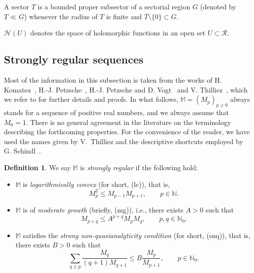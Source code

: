 \documentclass[11pt,a4paper]{article}
\theoremstyle{definition}
\newtheorem{defi}[theo]{Definition}
\def\N{\mathbb{N}}
\def\M{\mathbb{M}}
\def\bM{\mathbb{M}}%
\begin{document}
A sector $T$ is a bounded proper subsector of a sectorial region $G$ (denoted by $T\ll G$) whenever the radius of $T$ is finite and $\overline{T}\setminus\{0\}\subset G$.
\par\noindent

$\mathcal{H}(U)$ denotes the space of holomorphic functions in an open set $U\subset\mathcal{R}$.\par\noindent





\subsection{Strongly regular sequences}\label{stronregseq}



Most of the information in this subsection is taken from the works of
H. Komatsu~\cite{komatsu}, H.-J. Petzsche~\cite{Pet}, H.-J. Petzsche and D. Vogt~\cite{petvog} and V. Thilliez~\cite{thilliez},
which we refer to for further details and proofs. In what follows, $\M=(M_p)_{p\geq 0}$ always stands for
a sequence of positive real numbers, and we always assume that $M_0=1$. There is no general agreement in the literature on
the terminology describing the forthcoming properties. For the convenience of the reader, we have used the names given by
V.~Thilliez and the descriptive shortcuts employed by G. Schindl~\cite{Schindl}.

\begin{defi}  We say $\M$ is {\it strongly regular} if the following hold:
\begin{itemize}
\item[(i)]  $\M$ is \textit{logarithmically convex} (for short, (lc)), that is,
$$M_{p}^{2}\le M_{p-1}M_{p+1},\qquad p\in\N.
$$
\item[(ii)]  $\M$ is of \textit{moderate growth} (briefly, (mg)), i.e., there exists $A>0$ such that
$$M_{p+q}\le A^{p+q}M_{p}M_{q},\qquad p,q\in\N_0.$$
\item[(iii)]  $\bM$ satisfies the \textit{strong non-quasianalyticity condition} (for short, (snq)), that is, there exists $B>0$ such that
$$
\sum_{q\ge p}\frac{M_{q}}{(q+1)M_{q+1}}\le B\frac{M_{p}}{M_{p+1}},\qquad p\in\N_0.
$$
\end{itemize}
\end{defi}
\end{document}
